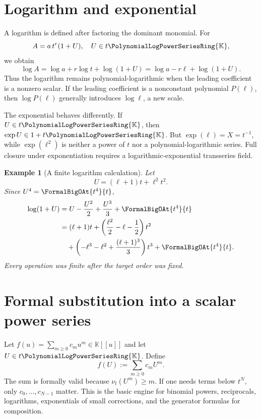 \documentclass[11pt,oneside,openany]{book}
\newtheorem{example}[theorem]{Example}
\newcommand{\K}{\mathbb{K}}
\newcommand{\Rring}{\PolynomialLogPowerSeriesRing{\K}}
\newcommand{\ordt}{\nu_t}
\begin{document}
\section{Logarithm and exponential}
A logarithm is defined after factoring the dominant monomial.  For
\[
 A=a\,t^r(1+U),
 \quad U\in t\Rring,
\]
we obtain
\begin{equation}\label{eq:logfactor}
 \log A=\log a+r\log t+\log(1+U)
       =\log a-r\ell+\log(1+U).
\end{equation}
Thus the logarithm remains polynomial-logarithmic when the leading coefficient
is a nonzero scalar.  If the leading coefficient is a nonconstant polynomial
\(P(\ell)\), then \(\log P(\ell)\) generally introduces \(\log\ell\), a new
scale.

The exponential behaves differently.  If \(U\in t\Rring\), then \(\exp U\in
1+t\Rring\).  But \(\exp(\ell)=X=t^{-1}\), while \(\exp(\ell^2)\) is neither a
power of \(t\) nor a polynomial-logarithmic series.  Full closure under
exponentiation requires a logarithmic-exponential transseries field.

\begin{example}[A finite logarithm calculation]
Let
\[
 U=(\ell+1)t+\ell^2t^2.
\]
Since \(U^4=\FormalBigOAt{t^4}{t}\),
\begin{align*}
 \log(1+U)
 & =U-\frac{U^2}{2}+\frac{U^3}{3}+\FormalBigOAt{t^4}{t}\\
 & =(\ell+1)t
 +\left(\frac{\ell^2}{2}-\ell-\frac12\right)t^2\\
 &\quad+
 \left(-\ell^3-\ell^2+\frac{(\ell+1)^3}{3}\right)t^3
 +\FormalBigOAt{t^4}{t}.
\end{align*}
Every operation was finite after the target order was fixed.
\end{example}

\section{Formal substitution into a scalar power series}
Let \(f(u)=\sum_{m\geq0}c_mu^m\in\K[[u]]\) and let \(U\in t\Rring\).  Define
\begin{equation}\label{eq:scalarfunctional}
 f(U):=\sum_{m\geq0}c_mU^m.
\end{equation}
The sum is formally valid because \(\ordt(U^m)\geq m\).  If one needs terms
below \(t^N\), only \(c_0,\ldots,c_{N-1}\) matter.  This is the basic engine for
binomial powers, reciprocals, logarithms, exponentials of small corrections,
and the generator formulas for composition.
\end{document}
